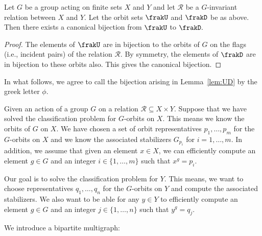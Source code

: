 \bigskip


\begin{lemma}\label{lem:UD}
Let $G$ be a group acting on finite sets $X$ and $Y$ and let  
${\mathcal R}$ be a $G$-invariant relation between $X$ and $Y.$ 
Let the orbit sets $\frakU$ and $\frakD$ be as above.
Then there exists a canonical bijection from $\frakU$ to $\frakD.$ 
\end{lemma}
\begin{proof}
The elements of $\frakU$ are in bijection to the orbits of $G$ 
on the flags (i.e., incident pairs) of the relation ${\mathcal R}.$ 
By symmetry, the elements of $\frakD$ are  in bijection to these orbits also. 
This gives the canonical bijection.\eop
\end{proof}

\bigskip

In what follows, we agree to call the bijection arising in Lemma~\ref{lem:UD} by the greek letter $\phi$.


\bigskip


Given an action of a group $G$ on a relation 
${\mathcal R} \subseteq  X\times Y.$
Suppose that we have solved the classification 
problem for $G$-orbits on $X.$
This means we know the orbits of $G$ on $X.$
We have chosen a set of orbit representatives 
$p_1, \ldots, p_m$ for the $G$-orbits on $X$ 
and we know the associated stabilizers $G_{p_i}$ for $i=1,\ldots,m.$ 
In addition, we assume that given an element $x \in X$, 
we can efficiently compute an element $g \in G$ and an integer $i \in \{ 1,\ldots,m\}$  such that $x^g = p_i.$ 


\bigskip

Our goal is to solve the classification problem for $Y$. 
This means, we want to choose representatives $q_1,\ldots,q_n$ for the $G$-orbits on $Y$ 
and compute the associated stabilizers. 
We also want to be able for any $y \in Y$ to efficiently compute 
an element $g \in G$ and an integer $j \in \{ 1,\ldots,n\}$  such that $y^g = q_j.$ 


\bigskip

We introduce a bipartite multigraph:

\bigskip

